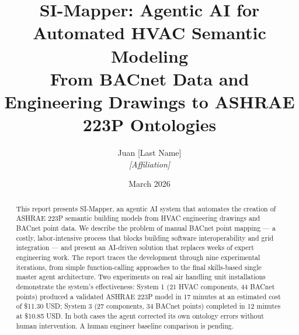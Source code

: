 \documentclass[11pt, a4paper]{article}
\title{SI-Mapper: Agentic AI for Automated HVAC Semantic Modeling\\[0.5em]
\large From BACnet Data and Engineering Drawings to ASHRAE 223P Ontologies}
\author{Juan [Last Name] \\ \textit{[Affiliation]}}
\date{March 2026}
\begin{document}
\maketitle

\begin{abstract}
This report presents SI-Mapper, an agentic AI system that automates the creation of ASHRAE 223P semantic building models from HVAC engineering drawings and BACnet point data. We describe the problem of manual BACnet point mapping --- a costly, labor-intensive process that blocks building software interoperability and grid integration --- and present an AI-driven solution that replaces weeks of expert engineering work. The report traces the development through nine experimental iterations, from simple function-calling approaches to the final skills-based single master agent architecture. Two experiments on real air handling unit installations demonstrate the system's effectiveness: System 1 (21 HVAC components, 44 BACnet points) produced a validated ASHRAE 223P model in 17 minutes at an estimated cost of \$11.30 USD; System 3 (27 components, 34 BACnet points) completed in 12 minutes at \$10.85 USD. In both cases the agent corrected its own ontology errors without human intervention. A human engineer baseline comparison is pending.
\end{abstract}

\tableofcontents
\newpage









\end{document}
